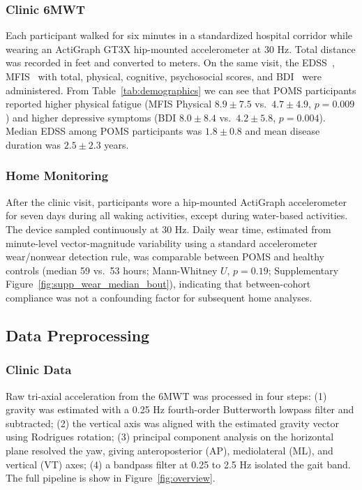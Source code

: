 \documentclass{article}
\begin{document}
\subsubsection{Clinic 6MWT}
Each participant walked for six minutes in a standardized hospital corridor while wearing an ActiGraph GT3X hip-mounted accelerometer at 30 Hz. Total distance was recorded in feet and converted to meters. On the same visit, the EDSS~\cite{kurtzke1983rating}, MFIS~\cite{krupp1989fatigue} with total, physical, cognitive, psychosocial scores, and BDI~\cite{beck1961inventory} were administered. From Table~\ref{tab:demographics} we can see that POMS participants reported higher physical fatigue (MFIS Physical $8.9 \pm 7.5$ vs.\ $4.7 \pm 4.9$, $p = 0.009$) and higher depressive symptoms (BDI $8.0 \pm 8.4$ vs.\ $4.2 \pm 5.8$, $p = 0.004$). Median EDSS among POMS participants was $1.8 \pm 0.8$ and mean disease duration was $2.5 \pm 2.3$ years.

\subsubsection{Home Monitoring}
After the clinic visit, participants wore a hip-mounted ActiGraph accelerometer for seven days during all waking activities, except during water-based activities. The device sampled continuously at 30 Hz. Daily wear time, estimated from minute-level vector-magnitude variability using a standard accelerometer wear/nonwear detection rule, was comparable between POMS and healthy controls (median 59 vs.\ 53 hours; Mann-Whitney $U$, $p = 0.19$; Supplementary Figure~\ref{fig:supp_wear_median_bout}), indicating that between-cohort compliance was not a confounding factor for subsequent home analyses.

\subsection{Data Preprocessing}\label{sec:preprocessing}

\subsubsection{Clinic Data}
Raw tri-axial acceleration from the 6MWT was processed in four steps: (1) gravity was estimated with a 0.25 Hz fourth-order Butterworth lowpass filter and subtracted; (2) the vertical axis was aligned with the estimated gravity vector using Rodrigues rotation; (3) principal component analysis on the horizontal plane resolved the yaw, giving anteroposterior (AP), mediolateral (ML), and vertical (VT) axes; (4) a bandpass filter at 0.25 to 2.5 Hz isolated the gait band. The full pipeline is show in Figure~\ref{fig:overview}.
\end{document}
